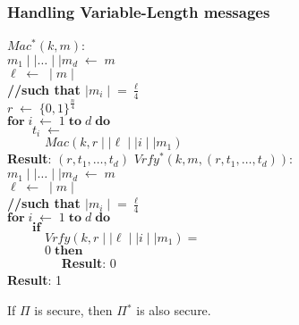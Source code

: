 \documentclass[../main]{subfiles}
\begin{document}
\subsubsection{Handling Variable-Length messages}
$Mac^{*}(k, m)$:\\
$m_1 \mid\mid{} \ldots{} \mid\mid{} m_d \; \leftarrow{} \; m$\\
$\ell{} \; \leftarrow{} \; \mid{} m \mid{}$\\
\textbf{//such that $\mid{} m_i \mid{} = \frac{\ell{}}{4}$}\\
$r \; \leftarrow{} \; \{0, 1\}^{\frac{n}{4}}$\\
$\textbf{for} \; i \; \leftarrow{} \; 1 \; \textbf{to} \; d \; \textbf{do}$\\
$\quad{}\quad{} t_i \; \leftarrow{} \;$\\
$\quad{}\quad{}\quad{} Mac(k, r\mid\mid{}\ell\mid\mid{}i\mid\mid{}m_1)$\\
\textbf{Result}: $(r, t_1, \ldots{},t_d)$
\newline
\newline
$Vrfy^{*}(k, m, (r, t_1, \ldots{}, t_d))$:\\
$m_1 \mid\mid{} \ldots{} \mid\mid{} m_d \; \leftarrow{} \; m$\\
$\ell{} \; \leftarrow{} \; \mid{} m \mid{}$\\
\textbf{//such that $\mid{} m_i \mid{} = \frac{\ell{}}{4}$}\\
$\textbf{for} \; i \; \leftarrow{} \; 1 \; \textbf{to} \; d \; \textbf{do}$\\
$\quad{}\quad{} \textbf{if}$\\
$\quad{}\quad{}\quad{} Vrfy(k, r\mid\mid{}\ell\mid\mid{}i\mid\mid{}m_1) = $\\
$\quad{}\quad{}\quad{} 0 \; \textbf{then}$\\
$\quad{}\quad{}\quad{}\quad{}$ \textbf{Result}: 0\\
\textbf{Result}: 1

\begin{theorem}
    If $\Pi{}$ is secure, then $\Pi{}^*$ is also secure.
\end{theorem}
\end{document}
